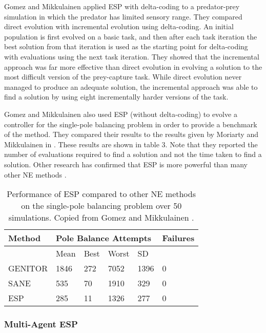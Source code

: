 \documentclass[12pt]{article} %
\begin{document}
Gomez and Mikkulainen applied ESP with delta-coding to a predator-prey simulation in which the predator has limited sensory range. They compared direct evolution with incremental evolution using delta-coding. An initial population is first evolved on a basic task, and then after each task iteration the best solution from that iteration is used as the starting point for delta-coding with evaluations using the next task iteration. They showed that the incremental approach was far more effective than direct evolution in evolving a solution to the most difficult version of the prey-capture task. While direct evolution never managed to produce an adequate solution, the incremental approach was able to find a solution by using eight incrementally harder versions of the task.

Gomez and Mikkulainen also used ESP (without delta-coding) to evolve a controller for the single-pole balancing problem in order to provide a benchmark of the method. They compared their results to the results given by Moriarty and Mikkulainen in \cite{Moriarty1996}. These results are shown in table 3. Note that they reported the number of evaluations required to find a solution and not the time taken to find a solution. Other research has confirmed that ESP is more powerful than many other NE methods \cite{Yong2001}.

\begin{table} \centering
    \begin{tabular}{|l|l|l|l|l|l|}
    \hline
    Method  & \multicolumn{4}{l|}{Pole Balance Attempts} & Failures \\ \hline
    ~       & Mean                  & Best & Worst & SD   & ~        \\ \hline
    GENITOR & 1846                  & 272  & 7052  & 1396 & 0        \\ \hline
    SANE    & 535                   & 70   & 1910  & 329  & 0        \\ \hline
    ESP     & 285                   & 11   & 1326  & 277  & 0        \\ \hline
    \end{tabular}
    \caption {Performance of ESP compared to other NE methods on the single-pole balancing problem over 50 simulations. Copied from Gomez and Mikkulainen \cite{Gomez1997}.}
\end{table}

\subsubsection{Multi-Agent ESP}
\end{document}
